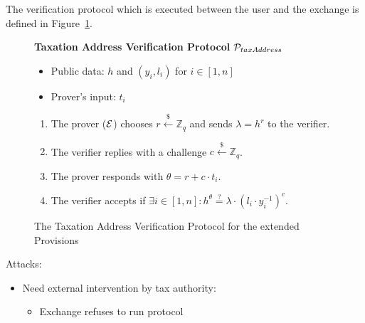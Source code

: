 The verification protocol which is executed between the user and the exchange
is defined in Figure~\ref{fig:taxation_verification_proto}.

\begin{figure}[h]
\begin{mdframed}

\begin{center}
    \textbf{Taxation Address Verification Protocol} $\mathcal{P}_{taxAddress}$
\end{center}

    \begin{itemize}[$\cdot$]
        \item Public data: $h$ and $(y_i, l_i)$ for $i \in [1, n]$
        \item Prover's input: $t_i$
    \end{itemize}

    \begin{enumerate}
        \item The prover ($\mathcal{E}$) chooses $r \xleftarrow{\$} \mathbb{Z}_q$
            and sends $\lambda = h^r$ to the verifier.
        \item The verifier replies with a challenge $c \xleftarrow{\$} \mathbb{Z}_q$.
        \item The prover responds with $\theta = r + c \cdot t_i$.
        \item The verifier accepts if $\exists i \in [1, n]: h^\theta \stackrel{?}{=} \lambda \cdot (l_i \cdot y_i^{-1})^c$.
    \end{enumerate}

\end{mdframed}
\caption{The Taxation Address Verification Protocol for the extended Provisions}
\label{fig:taxation_verification_proto}
\end{figure}

Attacks:

\begin{itemize}
    \item Need external intervention by tax authority:
        \begin{itemize}
            \item Exchange refuses to run protocol
        \end{itemize}
\end{itemize}

